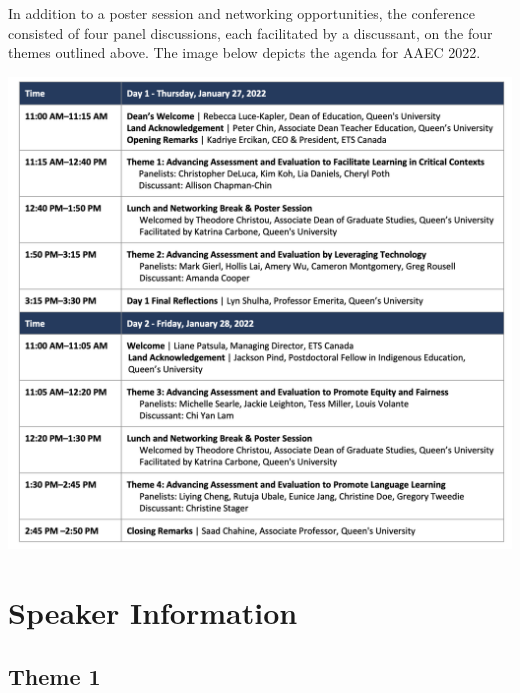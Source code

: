 \documentclass[
]{book}
\begin{document}
In addition to a poster session and networking opportunities, the conference consisted of four panel discussions, each facilitated by a discussant, on the four themes outlined above. The image below depicts the agenda for AAEC 2022.

\includegraphics{Content/N.png}
\newpage

\hypertarget{speaker-information}{%
\chapter*{Speaker Information}\label{speaker-information}}

\hypertarget{theme-1}{%
\section*{Theme 1}\label{theme-1}}
\end{document}
